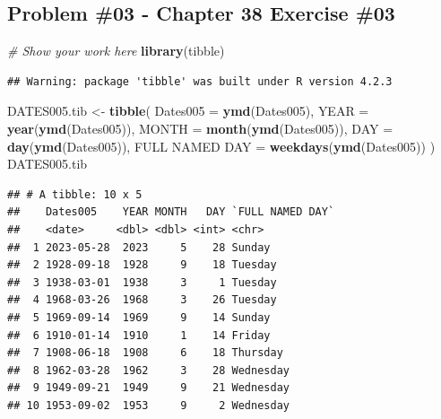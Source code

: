\documentclass[
]{article}
\newenvironment{Shaded}{\begin{snugshade}}{\end{snugshade}}
\newcommand{\AttributeTok}[1]{\textcolor[rgb]{0.13,0.29,0.53}{#1}}
\newcommand{\CommentTok}[1]{\textcolor[rgb]{0.56,0.35,0.01}{\textit{#1}}}
\newcommand{\FunctionTok}[1]{\textcolor[rgb]{0.13,0.29,0.53}{\textbf{#1}}}
\newcommand{\NormalTok}[1]{#1}
\newcommand{\OtherTok}[1]{\textcolor[rgb]{0.56,0.35,0.01}{#1}}
\newcommand{\StringTok}[1]{\textcolor[rgb]{0.31,0.60,0.02}{#1}}
\begin{document}
\newpage

\hypertarget{problem-03---chapter-38-exercise-03}{%
\subsection{Problem \#03 - Chapter 38 Exercise
\#03}\label{problem-03---chapter-38-exercise-03}}

\begin{Shaded}
\begin{Highlighting}[]
\CommentTok{\# Show your work here}
\FunctionTok{library}\NormalTok{(tibble)}
\end{Highlighting}
\end{Shaded}

\begin{verbatim}
## Warning: package 'tibble' was built under R version 4.2.3
\end{verbatim}

\begin{Shaded}
\begin{Highlighting}[]
\NormalTok{DATES005.tib }\OtherTok{\textless{}{-}} \FunctionTok{tibble}\NormalTok{(}
  \AttributeTok{Dates005 =} \FunctionTok{ymd}\NormalTok{(Dates005),        }
  \AttributeTok{YEAR =} \FunctionTok{year}\NormalTok{(}\FunctionTok{ymd}\NormalTok{(Dates005)),}
  \AttributeTok{MONTH =} \FunctionTok{month}\NormalTok{(}\FunctionTok{ymd}\NormalTok{(Dates005)),}
  \AttributeTok{DAY =} \FunctionTok{day}\NormalTok{(}\FunctionTok{ymd}\NormalTok{(Dates005)),}
  \StringTok{\textasciigrave{}}\AttributeTok{FULL NAMED DAY}\StringTok{\textasciigrave{}} \OtherTok{=} \FunctionTok{weekdays}\NormalTok{(}\FunctionTok{ymd}\NormalTok{(Dates005))}
\NormalTok{)}
\NormalTok{DATES005.tib}
\end{Highlighting}
\end{Shaded}

\begin{verbatim}
## # A tibble: 10 x 5
##    Dates005    YEAR MONTH   DAY `FULL NAMED DAY`
##    <date>     <dbl> <dbl> <int> <chr>           
##  1 2023-05-28  2023     5    28 Sunday          
##  2 1928-09-18  1928     9    18 Tuesday         
##  3 1938-03-01  1938     3     1 Tuesday         
##  4 1968-03-26  1968     3    26 Tuesday         
##  5 1969-09-14  1969     9    14 Sunday          
##  6 1910-01-14  1910     1    14 Friday          
##  7 1908-06-18  1908     6    18 Thursday        
##  8 1962-03-28  1962     3    28 Wednesday       
##  9 1949-09-21  1949     9    21 Wednesday       
## 10 1953-09-02  1953     9     2 Wednesday
\end{verbatim}
\end{document}
